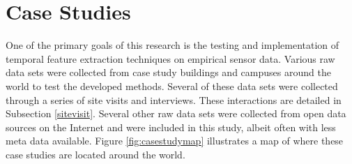 \section{Case Studies}
\label{sec:casestudies}

One of the primary goals of this research is the testing and implementation of temporal feature extraction techniques on empirical sensor data. Various raw data sets were collected from case study buildings and campuses around the world to test the developed methods. Several of these data sets were collected through a series of site visits and interviews. These interactions are detailed in Subsection \ref{sitevisit}. Several other raw data sets were collected from open data sources on the Internet and were included in this study, albeit often with less meta data available. Figure \ref{fig:casestudymap} illustrates a map of where these case studies are located around the world.